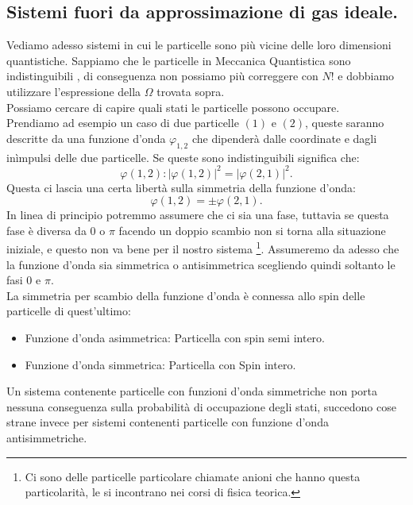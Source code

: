 \subsection{Sistemi fuori da approssimazione di gas ideale.}%
Vediamo adesso sistemi in cui le particelle sono più vicine delle loro dimensioni quantistiche. Sappiamo che le particelle in Meccanica Quantistica sono indistinguibili , di conseguenza non possiamo più correggere con $N!$ e dobbiamo utilizzare l'espressione della $\Omega$ trovata sopra.\\
Possiamo cercare di capire quali stati le particelle possono occupare.\\
Prendiamo ad esempio un caso di due particelle $( 1) $ e $( 2) $, queste saranno descritte da una funzione d'onda $\varphi_{1,2}$ che dipenderà dalle coordinate e dagli inìmpulsi delle due particelle. Se queste sono indistinguibili significa che:
\[
	\varphi ( 1,2): \left| \varphi ( 1,2)  \right| ^2 = \left| \varphi ( 2,1)  \right| ^2
.\] 
Questa ci lascia una certa libertà sulla simmetria della funzione d'onda:
\[
\varphi( 1,2) = \pm \varphi( 2,1) 
.\] 
In linea di principio potremmo assumere che ci sia una fase, tuttavia se questa fase è diversa da 0 o $\pi$ facendo un doppio scambio non si torna alla situazione iniziale, e questo non va bene per il nostro sistema \footnote{Ci sono delle particelle particolare chiamate anioni che hanno questa particolarità, le si incontrano nei corsi di fisica teorica.}.
Assumeremo da adesso che la funzione d'onda sia simmetrica o antisimmetrica scegliendo quindi soltanto le fasi $0$ e $\pi$.\\
La simmetria per scambio della funzione d'onda è connessa allo spin delle particelle di quest'ultimo:
\begin{itemize}
	\item Funzione d'onda asimmetrica: Particella con spin semi intero.
	\item Funzione d'onda simmetrica: Particella con Spin intero.
\end{itemize}
Un sistema contenente particelle con funzioni d'onda simmetriche non porta nessuna conseguenza sulla probabilità di occupazione degli stati, succedono cose strane invece per sistemi contenenti particelle con funzione d'onda antisimmetriche.
